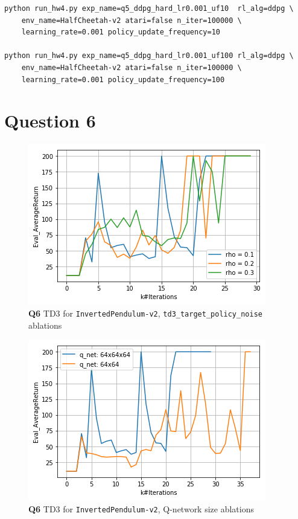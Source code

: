 \documentclass[11pt]{article}
\begin{document}
\begin{verbatim}
python run_hw4.py exp_name=q5_ddpg_hard_lr0.001_uf10  rl_alg=ddpg \
    env_name=HalfCheetah-v2 atari=false n_iter=100000 \
    learning_rate=0.001 policy_update_frequency=10

python run_hw4.py exp_name=q5_ddpg_hard_lr0.001_uf100 rl_alg=ddpg \
    env_name=HalfCheetah-v2 atari=false n_iter=100000 \
    learning_rate=0.001 policy_update_frequency=100
\end{verbatim}

\clearpage


\section{Question 6}
\label{sec:orge0c69cb}

\begin{figure}[htbp]
\centering
\includegraphics[width=.9\linewidth]{./61.png}
\caption{\textbf{Q6} TD3 for \texttt{InvertedPendulum-v2}, \texttt{td3\_target\_policy\_noise} ablations}
\end{figure}


\begin{figure}[htbp]
\centering
\includegraphics[width=.9\linewidth]{./62.png}
\caption{\textbf{Q6} TD3 for \texttt{InvertedPendulum-v2}, Q-network size ablations}
\end{figure}
\end{document}
